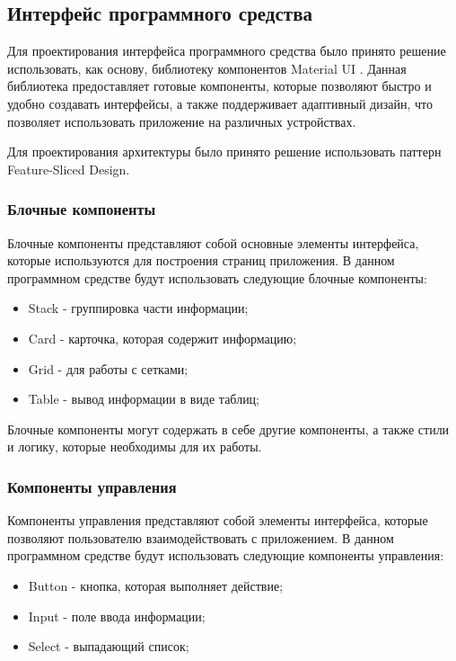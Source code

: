 \subsection{Интерфейс программного средства}

Для проектирования интерфейса программного средства было принято решение использовать, как основу, библиотеку компонентов Material UI
\cite{muiDocs}. Данная библиотека предоставляет готовые компоненты, которые позволяют быстро и удобно создавать интерфейсы, а также поддерживает
адаптивный дизайн, что позволяет использовать приложение на различных устройствах.

Для проектирования архитектуры было принято решение использовать паттерн Feature-Sliced Design.

\subsubsection{Блочные компоненты}

Блочные компоненты представляют собой основные элементы интерфейса, которые используются для построения страниц приложения.
В данном программном средстве будут использовать следующие блочные компоненты:
\begin{itemize}
    \item Stack - группировка части информации;
    \item Card - карточка, которая содержит информацию;
    \item Grid - для работы с сетками;
    \item Table - вывод информации в виде таблиц;
\end{itemize}

Блочные компоненты могут содержать в себе другие компоненты, а также стили и логику, которые необходимы для их работы.

\subsubsection{Компоненты управления}

Компоненты управления представляют собой элементы интерфейса, которые позволяют пользователю взаимодействовать с приложением.
В данном программном средстве будут использовать следующие компоненты управления:
\begin{itemize}
    \item Button - кнопка, которая выполняет действие;
    \item Input - поле ввода информации;
    \item Select - выпадающий список;
\end{itemize}

